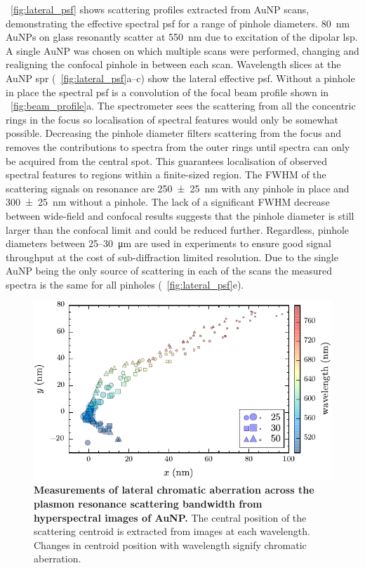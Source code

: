 \documentclass{article}
\begin{document}
\figurename~\ref{fig:lateral_psf} shows scattering profiles extracted from AuNP scans, demonstrating the effective spectral \gls{psf} for a range of pinhole diameters. \SI{80}{nm} AuNPs on glass resonantly scatter at \SI{550}{nm} due to excitation of the dipolar \gls{lsp}. A single AuNP was chosen on which multiple scans were performed, changing and realigning the confocal pinhole in between each scan. Wavelength slices at the AuNP \gls{spr} (\figurename~\ref{fig:lateral_psf}a--c) show the lateral effective \gls{psf}. Without a pinhole in place the spectral \gls{psf} is a convolution of the focal beam profile shown in \figurename~\ref{fig:beam_profile}a. The spectrometer sees the scattering from all the concentric rings in the focus so localisation of spectral features would only be somewhat possible. Decreasing the pinhole diameter filters scattering from the focus and removes the contributions to spectra from the outer rings until spectra can only be acquired from the central spot. This guarantees localisation of observed spectral features to regions within a finite-sized region. The FWHM of the scattering signals on resonance are \SI{250\pm25}{nm} with any pinhole in place and \SI{300\pm25}{nm} without a pinhole. The lack of a significant FWHM decrease between wide-field and confocal results suggests that the pinhole diameter is still larger than the confocal limit and could be reduced further. Regardless, pinhole diameters between 25--\SI{30}{\micro\metre} are used in experiments to ensure good signal throughput at the cost of sub-diffraction limited resolution. Due to the single AuNP being the only source of scattering in each of the scans the measured spectra is the same for all pinholes (\figurename~\ref{fig:lateral_psf}e).

\begin{figure}[bt]
\centering
\includegraphics{figures/lateral_chromatic_aberration}
\caption[Measurements of lateral chromatic aberration across the plasmon resonance scattering bandwidth from hyperspectral images of AuNP.]{\textbf{Measurements of lateral chromatic aberration across the plasmon resonance scattering bandwidth from hyperspectral images of AuNP.} The central position of the scattering centroid is extracted from images at each wavelength. Changes in centroid position with wavelength signify chromatic aberration.}
\label{fig:lateral_chromatic_aberration}
\end{figure}
\end{document}
